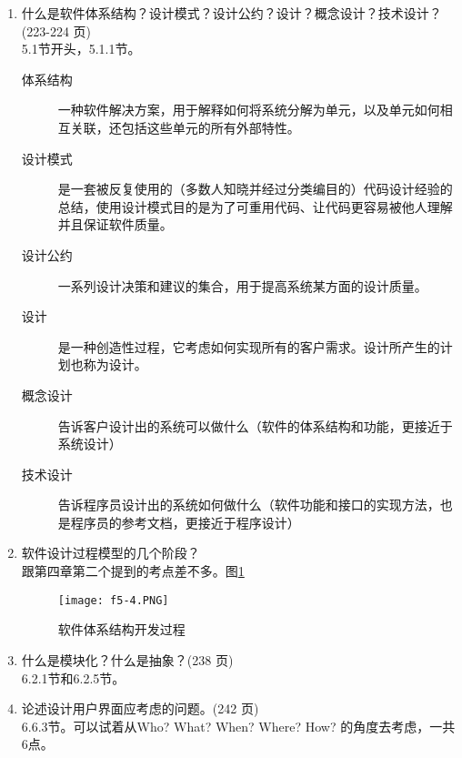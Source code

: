 \documentclass[14pt, letterpaper, UTF8, fontset=windowsnew, heading=true]{article}
\begin{document}
\begin{enumerate}
	\item 什么是软件体系结构？设计模式？设计公约？设计？概念设计？技术设计？(223-224
	页) \\
	5.1节开头，5.1.1节。
	\begin{description}
		\item[体系结构] 一种软件解决方案，用于解释如何将系统分解为单元，以及单元如何相互关联，还包括这些单元的所有外部特性。
		\item[设计模式] 是一套被反复使用的（多数人知晓并经过分类编目的）代码设计经验的总结，使用设计模式目的是为了可重用代码、让代码更容易被他人理解并且保证软件质量。
		\item[设计公约] 一系列设计决策和建议的集合，用于提高系统某方面的设计质量。
		\item[设计] 是一种创造性过程，它考虑如何实现所有的客户需求。设计所产生的计划也称为设计。
		\item[概念设计] 告诉客户设计出的系统可以做什么（软件的体系结构和功能，更接近于系统设计）
		\item[技术设计] 告诉程序员设计出的系统如何做什么（软件功能和接口的实现方法，也是程序员的参考文档，更接近于程序设计）
	\end{description}
	
	\item 软件设计过程模型的几个阶段？ \\
	跟第四章第二个提到的考点差不多。图\ref{fig:archtechturedev}
	\begin{figure}[h]
		\centering
		\texttt{[image: f5-4.PNG]}
		\caption{软件体系结构开发过程}
		\label{fig:archtechturedev}
	\end{figure}
	
	
	\item 什么是模块化？什么是抽象？(238 页) \\
	6.2.1节和6.2.5节。
	
	\item 论述设计用户界面应考虑的问题。(242 页) \\
	6.6.3节。可以试着从Who? What? When? Where? How? 的角度去考虑，一共6点。
	

\end{enumerate}
\end{document}
